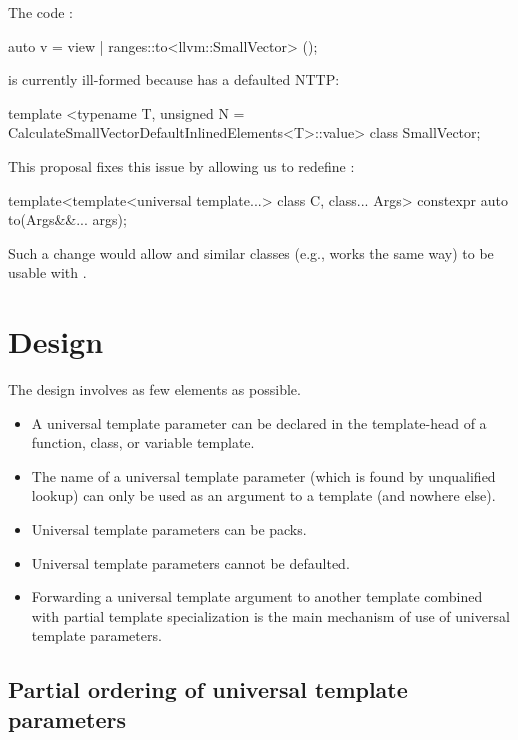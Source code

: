 \documentclass{wg21}
\begin{document}
The code :

\begin{colorblock}
auto v = view | ranges::to<llvm::SmallVector> ();
\end{colorblock}

is currently ill-formed because  has a defaulted NTTP:

\begin{colorblock}
template <typename T, unsigned N = CalculateSmallVectorDefaultInlinedElements<T>::value>
class SmallVector;
\end{colorblock}

This proposal fixes this issue by allowing us to redefine :

\begin{colorblock}
template<template<universal template...> class C, class... Args>
constexpr auto to(Args&&... args);
\end{colorblock}

Such a change would allow  and similar classes (e.g.,  works the same way) to be usable with .

\section{Design}

The design involves as few elements as possible.

\begin{itemize}
\item A universal template parameter can be declared in the template-head of a function, class, or variable template.
\item The name of a universal template parameter (which is found by unqualified lookup) can only be used as an argument to a template (and nowhere else).
\item Universal template parameters can be packs.
\item Universal template parameters cannot be defaulted.
\item Forwarding a universal template argument to another template combined with partial template specialization is the main mechanism of use of universal template parameters.
\end{itemize}

\subsection{Partial ordering of universal template parameters}
\end{document}
